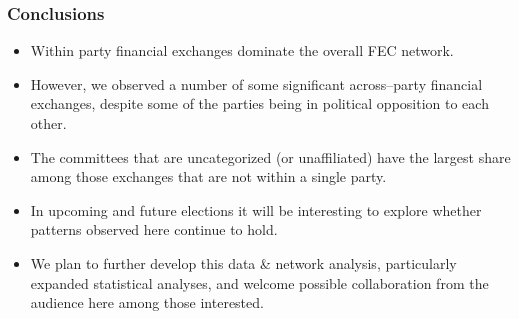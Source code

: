 \documentclass{beamer}
\begin{document}
\begin{frame}
\frametitle{Conclusions}

\begin{itemize}
\item Within party financial exchanges dominate the overall FEC network.
\item However,  we observed a number of some significant across--party financial exchanges,  despite some of the parties being in political opposition to each other.
\item The committees that are uncategorized (or unaffiliated) have the largest share among those exchanges that are not within a single party.
\item In upcoming and future elections it will be interesting to explore whether patterns observed here continue to hold.
\item We plan to further develop this data \& network analysis,  particularly expanded statistical analyses,  and welcome possible collaboration from the audience here among those interested.
\end{itemize}

\end{frame}
\end{document}
